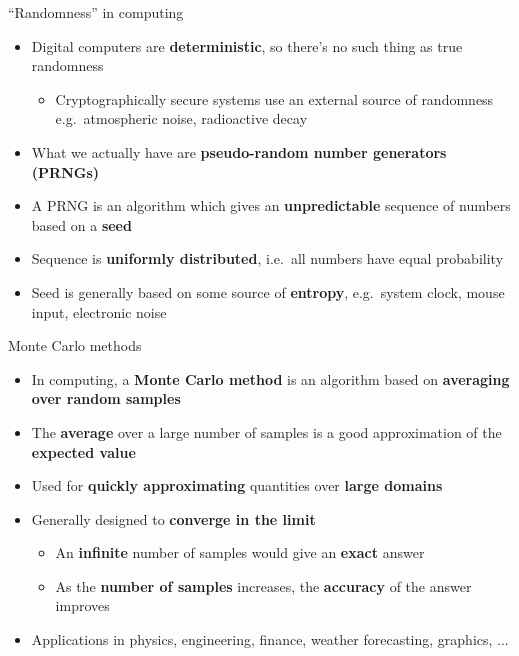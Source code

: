 \begin{frame}{``Randomness'' in computing}
	\begin{itemize}
		\pause\item Digital computers are \textbf{deterministic}, so there's no such thing as true randomness
			\begin{itemize}
				\pause\item Cryptographically secure systems use an external source of randomness e.g.\ atmospheric noise, radioactive decay
			\end{itemize}
		\pause\item What we actually have are \textbf{pseudo-random number generators (PRNGs)}
		\pause\item A PRNG is an algorithm which gives an \textbf{unpredictable} sequence of numbers based on a \textbf{seed}
		\pause\item Sequence is \textbf{uniformly distributed}, i.e.\ all numbers have equal probability
		\pause\item Seed is generally based on some source of \textbf{entropy}, e.g.\ system clock, mouse input, electronic noise
	\end{itemize}
\end{frame}

\begin{frame}{Monte Carlo methods}
	\begin{itemize}
		\pause\item In computing, a \textbf{Monte Carlo method} is an algorithm based on \textbf{averaging over random samples}
		\pause\item The \textbf{average} over a large number of samples is a good approximation of the \textbf{expected value}
		\pause\item Used for \textbf{quickly approximating} quantities over \textbf{large domains}
		\pause\item Generally designed to \textbf{converge in the limit}
			\begin{itemize}
				\pause\item An \textbf{infinite} number of samples would give an \textbf{exact} answer
				\pause\item As the \textbf{number of samples} increases, the \textbf{accuracy} of the answer improves
			\end{itemize}
		\pause\item Applications in physics, engineering, finance, weather forecasting, graphics, ...
	\end{itemize}
\end{frame}

